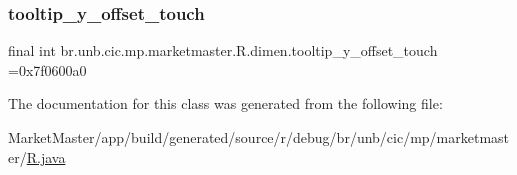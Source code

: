 \subsubsection{\texorpdfstring{tooltip\+\_\+y\+\_\+offset\+\_\+touch}{tooltip\_y\_offset\_touch}}
{\footnotesize\ttfamily final int br.\+unb.\+cic.\+mp.\+marketmaster.\+R.\+dimen.\+tooltip\+\_\+y\+\_\+offset\+\_\+touch =0x7f0600a0\hspace{0.3cm}{\ttfamily [static]}}



The documentation for this class was generated from the following file\+:\begin{DoxyCompactItemize}
\item 
Market\+Master/app/build/generated/source/r/debug/br/unb/cic/mp/marketmaster/\mbox{\hyperlink{debug_2br_2unb_2cic_2mp_2marketmaster_2R_8java}{R.\+java}}\end{DoxyCompactItemize}
